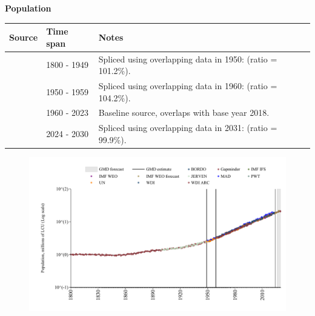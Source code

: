 \documentclass[12pt,a4paper,landscape]{article}
\begin{document}
\begin{adjustbox}{max totalsize={\paperwidth}{\paperheight},center}
\begin{minipage}[t][\textheight][t]{\textwidth}
\vspace*{0.5cm}
{}
\begin{center}
{\Large\bfseries Population}
\end{center}
\vspace{0.5cm}
\begin{table}[H]
\centering
\small
\begin{tabular}{|l|l|l|}
\hline
\textbf{Source} & \textbf{Time span} & \textbf{Notes} \\
\hline
\rowcolor{white}\cite{Gapminder}& 1800 - 1949 &Spliced using overlapping data in 1950: (ratio = 101.2\%). \\
\rowcolor{lightgray}\cite{IMF_IFS}& 1950 - 1959 &Spliced using overlapping data in 1960: (ratio = 104.2\%). \\
\rowcolor{white}\cite{WDI}& 1960 - 2023 &Baseline source, overlaps with base year 2018. \\
\rowcolor{lightgray}\cite{Gapminder}& 2024 - 2030 &Spliced using overlapping data in 2031: (ratio = 99.9\%). \\
\hline
\end{tabular}
\end{table}
\begin{figure}[H]
\centering
\includegraphics[width=\textwidth,height=0.6\textheight,keepaspectratio]{graphs/SEN_pop.pdf}
\end{figure}
\end{minipage}
\end{adjustbox}
\end{document}
